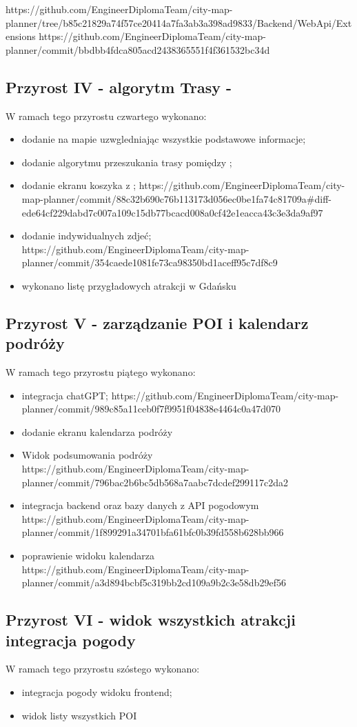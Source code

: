     https://github.com/EngineerDiplomaTeam/city-map-planner/tree/b85c21829a74f57ce20414a7fa3ab3a398ad9833/Backend/WebApi/Extensions
    https://github.com/EngineerDiplomaTeam/city-map-planner/commit/bbdbb4fdca805acd2438365551f4f361532bc34d


    \subsection{Przyrost IV - algorytm Trasy - }
    \label{sec:przyrost4}

    W ramach tego przyrostu czwartego wykonano:
    \begin{itemize}
        \item dodanie  na mapie uzwgledniając wszystkie podstawowe informacje;
        \item dodanie algorytmu przeszukania trasy pomiędzy ;
        \item dodanie ekranu koszyka z ;
        https://github.com/EngineerDiplomaTeam/city-map-planner/commit/88c32b690c76b113173d056ec0be1fa74c81709a#diff-ede64cf229dabd7c007a109c15db77bcacd008a0cf42e1eacca43c3e3da9af97
        \item dodanie indywidualnych zdjeć;
        https://github.com/EngineerDiplomaTeam/city-map-planner/commit/354caede1081fe73ca98350bd1aceff95c7df8c9
        \item wykonano listę przygładowych atrakcji w Gdańsku
    \end{itemize}


    \subsection{Przyrost V - zarządzanie POI i kalendarz podróży}
    \label{sec:przyrost5}

    W ramach tego przyrostu piątego wykonano:
    \begin{itemize}
        \item integracja chatGPT;
        https://github.com/EngineerDiplomaTeam/city-map-planner/commit/989c85a11ceb0f7f9951f04838e4464c0a47d070
        \item dodanie ekranu kalendarza podróży
        \item Widok podsumowania podróży
        https://github.com/EngineerDiplomaTeam/city-map-planner/commit/796bac2b6bc5db568a7aabc7dcdef299117c2da2
        \item integracja backend oraz bazy danych z API pogodowym
        https://github.com/EngineerDiplomaTeam/city-map-planner/commit/1f899291a34701bfa61bfc0b39fd558b628bb966
        \item poprawienie widoku kalendarza
        https://github.com/EngineerDiplomaTeam/city-map-planner/commit/a3d894bcbf5c319bb2cd109a9b2c3e58db29ef56
    \end{itemize}

    \subsection{Przyrost VI - widok wszystkich atrakcji integracja pogody}
    \label{sec:przyrost5}

    W ramach tego przyrostu szóstego wykonano:
    \begin{itemize}
        \item integracja pogody widoku frontend;
        \item widok listy wszystkich POI
    \end{itemize}

